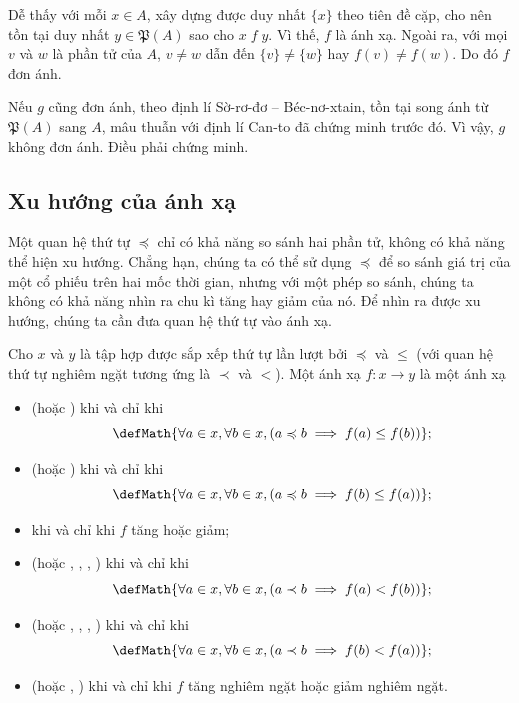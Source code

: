 Dễ thấy với mỗi $x \in A$, xây dựng được duy nhất $\{x\}$ theo tiên đề cặp, cho nên tồn tại duy nhất $y \in \mathfrak{P}(A)$ sao cho $x\;f\;y$. Vì thế, $f$ là ánh xạ. Ngoài ra, với mọi $v$ và $w$ là phần tử của $A$, $v \neq w$ dẫn đến $\{v\} \neq \{w\}$ hay $f(v) \neq f(w)$. Do đó $f$ đơn ánh.

Nếu $g$ cũng đơn ánh, theo định lí Sờ-rơ-đơ -- Béc-nơ-xtain, tồn tại song ánh từ $\mathfrak{P}(A)$ sang $A$, mâu thuẫn với định lí Can-to đã chứng minh trước đó. Vì vậy, $g$ không đơn ánh. Điều phải chứng minh.

\subsection{Xu hướng của ánh xạ}

Một quan hệ thứ tự $\preccurlyeq$ chỉ có khả năng so sánh hai phần tử, không có khả năng thể hiện xu hướng. Chẳng hạn, chúng ta có thể sử dụng $\preccurlyeq$ để so sánh giá trị của một cổ phiếu trên hai mốc thời gian, nhưng với một phép so sánh, chúng ta không có khả năng nhìn ra chu kì tăng hay giảm của nó. Để nhìn ra được xu hướng, chúng ta cần đưa quan hệ thứ tự vào ánh xạ.

Cho $x$ và $y$ là tập hợp được sắp xếp thứ tự lần lượt bởi $\preccurlyeq$ và $\leq$ (với quan hệ thứ tự nghiêm ngặt tương ứng là $\prec$ và $<$). Một ánh xạ $f: x \to y$ là một ánh xạ 
\begin{itemize}
   \item {} (hoặc ) khi và chỉ khi $$\defMath{\forall a \in x, \forall b \in x, (a \preccurlyeq b \implies f(a) \leq f(b))};$$
   \item {} (hoặc ) khi và chỉ khi $$\defMath{\forall a \in x, \forall b \in x, (a \preccurlyeq b \implies f(b) \leq f(a))};$$
   \item {} khi và chỉ khi $f$ tăng hoặc giảm;
   \item {} (hoặc , , , ) khi và chỉ khi $$\defMath{\forall a \in x, \forall b \in x, (a \prec b \implies f(a) < f(b))};$$
   \item {} (hoặc , , , ) khi và chỉ khi $$\defMath{\forall a \in x, \forall b \in x, (a \prec b \implies f(b) < f(a))};$$
   \item {} (hoặc , ) khi và chỉ khi $f$ tăng nghiêm ngặt hoặc giảm nghiêm ngặt.
\end{itemize}

